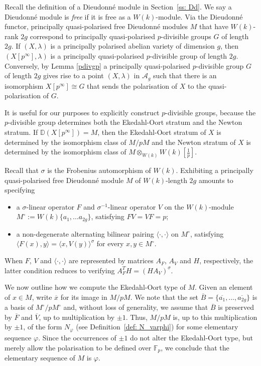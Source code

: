 \documentclass[11pt,table]{amsart}
\numberwithin{equation}{section}
\theoremstyle{definition}
\theoremstyle{remark}
\theoremstyle{remark}
\begin{document}
Recall the definition of a Dieudonn\'{e} module in Section~\ref{ss: Dd}. We say a Dieudonn\'{e} module is \emph{free} if it is free as a $W(k)$-module.
Via the Dieudonn\'{e} functor, principally quasi-polarised free Dieudonn\'{e} modules $M$ that have $W(k)$-rank $2g$ correspond to principally quasi-polarised $p$-divisible groups $G$ of length $2g$. If $(X,\lambda)$ is a principally polarised abelian variety of dimension $g$, then $(X[p^\infty],\lambda)$ is a principally quasi-polarised $p$-divisible group of length $2g$. Conversely, by Lemma \ref{pdivgp} a principally quasi-polarised $p$-divisible group $G$ of length $2g$ gives rise to a point $(X,\lambda)$ in $\mathcal{A}_g$ such that there is an isomorphism $X[p^\infty] \cong G$ that sends the polarisation of $X$ to the quasi-polarisation of $G$. 

It is useful for our purposes to explicitly construct $p$-divisible groups, because the $p$-divisible group determines both the Ekedahl-Oort stratum and the Newton stratum. If $\mathbb{D}(X[p^\infty])=M$, then the Ekedahl-Oort stratum of $X$ is determined by the isomorphism class of $M/pM$ and the Newton stratum of $X$ is determined by the isomorphism class of $M \otimes_{W(k)} W(k)[\frac{1}{p}]$.

Recall that $\sigma$ is the Frobenius automorphism of $W(k)$. Exhibiting a principally quasi-polarised free Dieudonn\'{e} module $M$ of $W(k)$-length $2g$ amounts to specifying
\begin{itemize}
    \item a $\sigma$-linear operator $F$ and $\sigma^{-1}$-linear operator $V$ on the $W(k)$-module $M^\circ :=W(k)\{a_1,\ldots a_{2g}\}$, satisfying $FV=VF=p$;
    \item a non-degenerate alternating bilinear pairing $\langle\cdot, \cdot\rangle$ on $M^\circ$, satisfying $ \langle F(x) , y \rangle = \langle x, V(y)\rangle^\sigma$ for every $x,y\in M^\circ$. 
    \end{itemize}
When $F$, $V$ and $\langle \cdot , \cdot \rangle$ are represented by matrices $A_F$, $A_V$ and $H$, respectively, the latter condition reduces to verifying $A_F^TH = (HA_V)^\sigma$.
    
We now outline how we compute the Ekedahl-Oort type of $M$. Given an element of $x\in M$, write $\overline{x}$ for its image in $M/pM$. We note that the set $\overline{B}=\{\overline{a_1}, \ldots ,\overline{a_{2g}}\}$ is a basis of $M^\circ/pM^\circ$ and, without loss of generality, we assume that $\overline{B}$ is preserved by $\overline{F}$ and $\overline{V}$, up to multiplication by $\pm 1$. Thus, $M/pM$ is, up to this multiplication by $\pm 1$, of the form $N_\varphi$ (see Definition~\ref{def: N_varphi}) for some elementary sequence $\varphi$. Since the occurrences of $\pm 1$ do not alter the Ekedahl-Oort type, but merely allow the polarisation to be defined over $\mathbb{F}_p$, we conclude that the elementary sequence of $M$ is $\varphi$.
\end{document}
